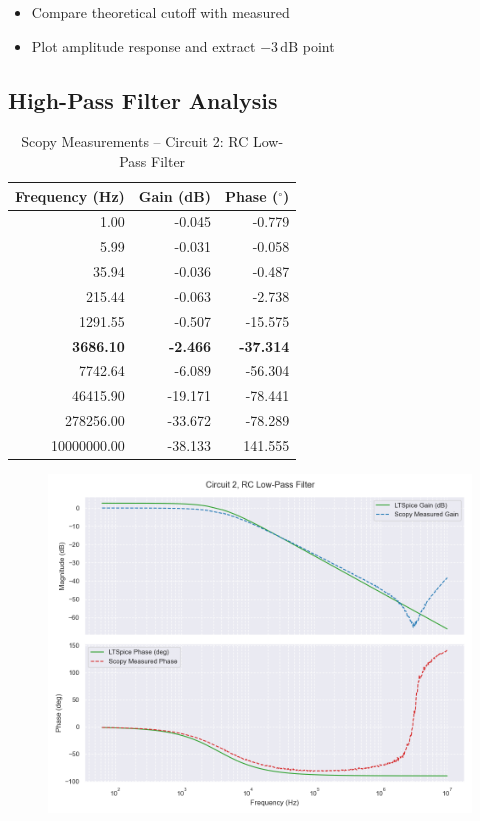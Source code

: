 \documentclass[12pt]{article}
\begin{document}
\begin{itemize}
	\item Compare theoretical cutoff with measured
	\item Plot amplitude response and extract $-3\,\mathrm{dB}$ point
\end{itemize}

\subsection{High-Pass Filter Analysis}

\begin{table}[H]
	\centering
	\caption{Scopy Measurements – Circuit 2: RC Low-Pass Filter}
	\begin{tabular}{|r|r|r|}
		\hline
		\textbf{Frequency (Hz)} & \textbf{Gain (dB)} & \textbf{Phase ($^\circ$)} \\
		\hline
		1.00                    & -0.045             & -0.779                    \\
		5.99                    & -0.031             & -0.058                    \\
		35.94                   & -0.036             & -0.487                    \\
		215.44                  & -0.063             & -2.738                    \\
		1291.55                 & -0.507             & -15.575                   \\
		\textbf{3686.10}        & \textbf{-2.466}    & \textbf{-37.314}          \\
		7742.64                 & -6.089             & -56.304                   \\
		46415.90                & -19.171            & -78.441                   \\
		278256.00               & -33.672            & -78.289                   \\
		10000000.00             & -38.133            & 141.555                   \\
		\hline
	\end{tabular}
\end{table}
\begin{figure}[H]
	\includegraphics[width=\textwidth]{e6_bode2}
\end{figure}
\end{document}
